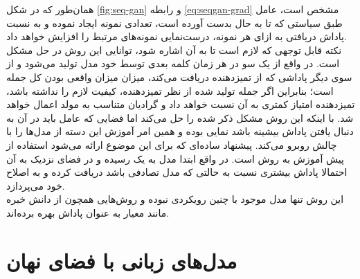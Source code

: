 همان‌طور که در شکل \ref{fig:seq-gan} و رابطه \ref{eq:seqgan-grad} مشخص است، عامل طبق سیاستی که تا به حال بدست آورده است، تعدادی نمونه ایجاد نموده و به نسبت پاداش دریافتی به ازای هر نمونه، درست‌نمایی نمونه‌های مرتبط را افزایش خواهد داد.\\
نکته قابل توجهی که لازم است تا به آن اشاره شود، توانایی این روش در حل مشکل \expbias{} است. در واقع از یک سو در هر زمان کلمه بعدی توسط خود مدل تولید می‌شود و از سوی دیگر پاداشی که از تمیزدهنده دریافت می‌کند، میزان میزان واقعی بودن کل جمله است؛ بنابراین اگر جمله تولید شده از نظر تمیزدهنده، کیفیت لازم را نداشته باشد، تمیزدهنده امتیاز کمتری به آن نسبت خواهد داد و گرادیان متناسب به مولد اعمال خواهد شد. با اینکه این روش مشکل ذکر شده را حل می‌کند اما فضایی که عامل باید در آن به دنبال یافتن پاداش بیشینه باشد نمایی بوده و همین امر آموزش این دسته از مدل‌ها را با چالش روبرو می‌کند. پیشنهاد ساده‌ای که برای این موضوع ارائه می‌شود استفاده از پیش آموزش به روش \teacherforcing{} است. در واقع ابتدا مدل به یک  رسیده و در فضای نزدیک به آن احتمالا پاداش بیشتری نسبت به حالتی که مدل تصادفی باشد دریافت کرده و به اصلاح خود می‌پردازد.\\
این روش تنها مدل موجود با چنین رویکردی نبوده و روش‌هایی همچون \cite{pgbleu} از دانش خبره مانند معیار  به عنوان پاداش بهره برده‌اند.
\section{مدل‌های زبانی با فضای نهان}
